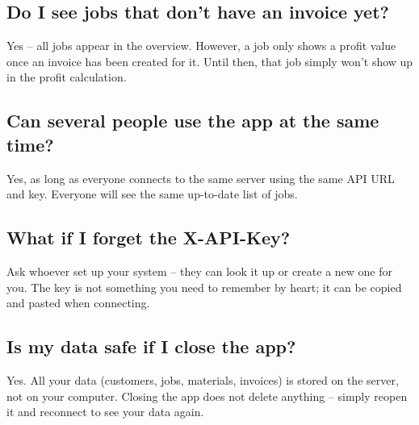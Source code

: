 \documentclass[11pt,a4paper]{article}
\begin{document}
\subsection*{Do I see jobs that don't have an invoice yet?}

Yes -- all jobs appear in the overview. However, a job only shows a profit value once an invoice has been created for it. Until then, that job simply won't show up in the profit calculation.

\subsection*{Can several people use the app at the same time?}

Yes, as long as everyone connects to the same server using the same API URL and key. Everyone will see the same up-to-date list of jobs.

\subsection*{What if I forget the X-API-Key?}

Ask whoever set up your system -- they can look it up or create a new one for you. The key is not something you need to remember by heart; it can be copied and pasted when connecting.

\subsection*{Is my data safe if I close the app?}

Yes. All your data (customers, jobs, materials, invoices) is stored on the server, not on your computer. Closing the app does not delete anything -- simply reopen it and reconnect to see your data again.
\end{document}
